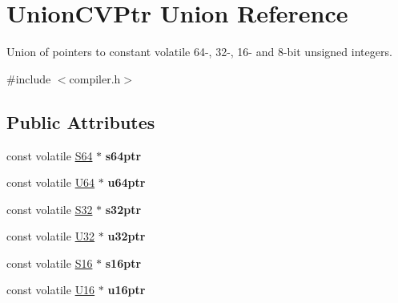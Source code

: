 \hypertarget{union_union_c_v_ptr}{\section{Union\-C\-V\-Ptr Union Reference}
\label{union_union_c_v_ptr}
}


Union of pointers to constant volatile 64-\/, 32-\/, 16-\/ and 8-\/bit unsigned integers.  




{\ttfamily \#include $<$compiler.\-h$>$}

\subsection*{Public Attributes}
\begin{DoxyCompactItemize}
\item 
\hypertarget{union_union_c_v_ptr_a707d4e218dbb787604879e8f3e4b88a0}{const volatile \hyperlink{group__group__xmega__utils_ga1d293e5c494dd6826239b02f5fe98e7f}{S64} $\ast$ {\bfseries s64ptr}}\label{union_union_c_v_ptr_a707d4e218dbb787604879e8f3e4b88a0}

\item 
\hypertarget{union_union_c_v_ptr_a21c8e70e260cbcfa6b1bcd5e36a65cc9}{const volatile \hyperlink{group__group__xmega__utils_ga25809e0734a149248fcf5831efa4e33d}{U64} $\ast$ {\bfseries u64ptr}}\label{union_union_c_v_ptr_a21c8e70e260cbcfa6b1bcd5e36a65cc9}

\item 
\hypertarget{union_union_c_v_ptr_ab9a23c3b3b42b195d56982ff8219b6e5}{const volatile \hyperlink{group__group__xmega__utils_ga39c786017723555afb9e8b85accec0de}{S32} $\ast$ {\bfseries s32ptr}}\label{union_union_c_v_ptr_ab9a23c3b3b42b195d56982ff8219b6e5}

\item 
\hypertarget{union_union_c_v_ptr_a9ba5f88bb47b6b78703eebade217a8f8}{const volatile \hyperlink{group__group__xmega__utils_ga696390429f2f3b644bde8d0322a24124}{U32} $\ast$ {\bfseries u32ptr}}\label{union_union_c_v_ptr_a9ba5f88bb47b6b78703eebade217a8f8}

\item 
\hypertarget{union_union_c_v_ptr_aba2be4a121bf17fd4469f35bb63ac608}{const volatile \hyperlink{group__group__xmega__utils_ga6d241ad21a823c90d4835380787db5d4}{S16} $\ast$ {\bfseries s16ptr}}\label{union_union_c_v_ptr_aba2be4a121bf17fd4469f35bb63ac608}

\item 
\hypertarget{union_union_c_v_ptr_a1c3a68ddb0ecd1e210015e6f07ae3589}{const volatile \hyperlink{group__group__xmega__utils_ga0a0a322d5fa4a546d293a77ba8b4a71f}{U16} $\ast$ {\bfseries u16ptr}}\label{union_union_c_v_ptr_a1c3a68ddb0ecd1e210015e6f07ae3589}


\end{DoxyCompactItemize}
